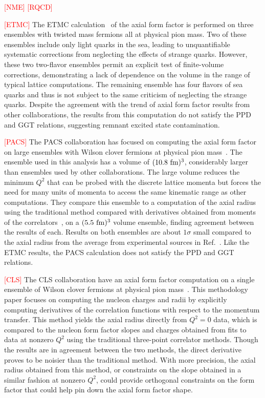 
\textcolor{red}{[NME]}
\textcolor{red}{[RQCD]}

\textcolor{red}{[ETMC]}
The ETMC calculation~\cite{Alexandrou:2020okk} of the axial form factor
 is performed on three ensembles with twisted mass fermions all at physical pion mass.
Two of these ensembles include only light quarks in the sea,
 leading to unquantifiable systematic corrections from
 neglecting the effects of strange quarks.
However, these two two-flavor ensembles permit an explicit test of finite-volume corrections,
 demonstrating a lack of dependence on the volume in the range of typical lattice computations.
The remaining ensemble has four flavors of sea quarks and thus is not subject
 to the same criticism of neglecting the strange quarks.
Despite the agreement with the trend of axial form factor results from other collaborations,
 the results from this computation do not satisfy the PPD and GGT relations,
 suggesting remnant excited state contamination.

\textcolor{red}{[PACS]}
The PACS collaboration has focused on computing the axial form factor
 on large ensembles with Wilson clover fermions at
 physical pion mass~\cite{Ishikawa:2018rew,Shintani:2018ozy}.
The ensemble used in this analysis has a volume of $(10.8~{\rm fm})^3$,
 considerably larger than ensembles used by other collaborations.
The large volume reduces the minimum $Q^2$ that can be probed
 with the discrete lattice momenta but forces the need for many units of momenta
 to access the same kinematic range as other computations.
They compare this ensemble to a computation of the axial radius using
 the traditional method compared with derivatives obtained from
 moments of the correlators~\cite{Aglietti:1994nx},
 on a $(5.5~{\rm fm})^3$ volume ensemble, finding agreement between the results of each.
Results on both ensembles are about $1\sigma$ small compared to the axial radius
 from the average from experimental sources in Ref.~\cite{Hill:2017wgb}.
Like the ETMC results, the PACS calculation does not satisfy the PPD and GGT relations.

\textcolor{red}{[CLS]}
The CLS collaboration have an axial form factor computation on a
 single ensemble of Wilson clover fermions at physical pion mass~\cite{Hasan:2017wwt}.
This methodology paper focuses on computing the nucleon charges
 and radii by explicitly computing derivatives of the correlation functions
 with respect to the momentum transfer.
This method yields the axial radius directly from $Q^2=0$ data,
 which is compared to the nucleon form factor slopes and charges obtained from
 fits to data at nonzero $Q^2$ using the traditional three-point correlator methods.
Though the results are in agreement between the two methods,
 the direct derivative proves to be noisier than the traditional method.
With more precision, the axial radius obtained from this method,
 or constraints on the slope obtained in a similar fashion at nonzero $Q^2$,
 could provide orthogonal constraints on the form factor that could
 help pin down the axial form factor shape.

